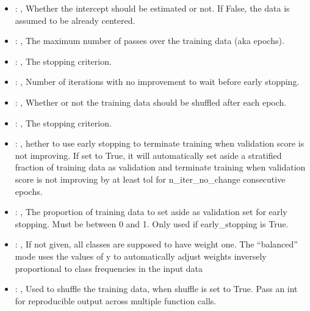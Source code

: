 \begin{itemize}
    \item {}: ,
      Whether the intercept should be estimated or not. If False,
      the data is assumed to be already centered.

    \item {}: ,
      The maximum number of passes over the training data (aka epochs).

    \item {}: ,
      The stopping criterion.

    \item {}: ,
      Number of iterations with no improvement to wait before early stopping.

    \item {}: ,
      Whether or not the training data should be shuffled after each epoch.

    \item {}: ,
      The stopping criterion.

    \item {}: ,
      hether to use early stopping to terminate training when validation score is not
      improving. If set to True, it will automatically set aside a stratified fraction of training
      data as validation and terminate training when validation score is not improving by at least
      tol for n\_iter\_no\_change consecutive epochs.

    \item {}: ,
      The proportion of training data to set aside as validation set for early stopping.
      Must be between 0 and 1. Only used if early\_stopping is True.

    \item {}: \xmlDesc{[balanced]},
      If not given, all classes are supposed to have weight one.
      The “balanced” mode uses the values of y to automatically adjust weights
      inversely proportional to class frequencies in the input data

    \item {}: ,
      Used to shuffle the training data, when shuffle is set to
      True. Pass an int for reproducible output across multiple function calls.


\end{itemize}

